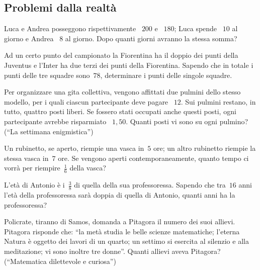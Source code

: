 \subsection{Problemi dalla realtà}
\begin{multicols}{2}
\begin{esercizio}[\Ast]
Luca e Andrea posseggono rispettivamente \officialeuro~$200$ e \officialeuro~$180$; Luca spende \officialeuro~$10$ al giorno e Andrea \officialeuro~$8$ al giorno. Dopo quanti giorni avranno la stessa somma?
\end{esercizio}

\begin{esercizio}[\Ast]
Ad un certo punto del campionato la Fiorentina ha il doppio dei punti della Juventus e l'Inter ha due terzi dei punti della Fiorentina. Sapendo che in totale i punti delle tre squadre sono~$78$, determinare i punti delle singole squadre.
\end{esercizio}

\begin{esercizio}[\Ast]
Per organizzare una gita collettiva, vengono affittati due pulmini dello stesso modello, per i quali ciascun partecipante deve pagare \officialeuro~$12$. Sui pulmini restano, in tutto, quattro posti liberi. Se fossero stati occupati anche questi posti, ogni partecipante avrebbe risparmiato \officialeuro~$1,50$. Quanti posti vi sono su ogni pulmino? (``La settimana enigmistica'')
\end{esercizio}

\begin{esercizio}
Un rubinetto, se aperto, riempie una vasca in~$5$ ore; un altro rubinetto riempie la stessa vasca in~$7$ ore. Se vengono aperti contemporaneamente, quanto tempo ci vorrà per riempire~$\frac{1}{6}$ della vasca?
\end{esercizio}

\begin{esercizio}[\Ast]
L'età di Antonio è i~$\frac{3}{8}$ di quella della sua professoressa. Sapendo che tra~$16$ anni l'età della professoressa sarà doppia di quella di Antonio, quanti anni ha la professoressa?
\end{esercizio}

\begin{esercizio}[\Ast]
Policrate, tiranno di Samos, domanda a Pitagora il numero dei suoi allievi. Pitagora risponde che: ``la metà studia le belle scienze matematiche; l'eterna Natura è oggetto dei lavori di un quarto; un settimo si esercita al silenzio e alla meditazione; vi sono inoltre tre donne''. Quanti allievi aveva Pitagora? (``Matematica dilettevole e curiosa'')
\end{esercizio}


\end{multicols}
